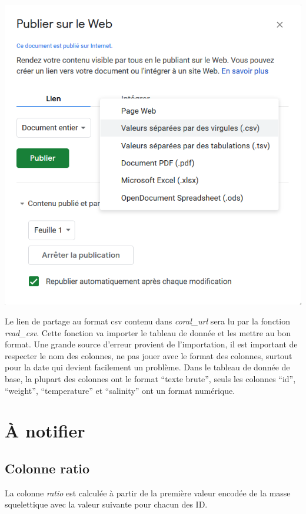\documentclass[]{book}
\begin{document}
\includegraphics{image/notebook-googlesheets2.png}

Le lien de partage au format csv contenu dans \emph{coral\_url} sera lu
par la fonction \emph{read\_csv}. Cette fonction va importer le tableau
de donnée et les mettre au bon format. Une grande source d'erreur
provient de l'importation, il est important de respecter le nom des
colonnes, ne pas jouer avec le format des colonnes, surtout pour la date
qui devient facilement un problème. Dans le tableau de donnée de base,
la plupart des colonnes ont le format ``texte brute'', seuls les
colonnes ``id'', ``weight'', ``temperature'' et ``salinity'' ont un
format numérique.

\section{À notifier}\label{a-notifier}

\subsection{Colonne ratio}\label{colonne-ratio}

La colonne \emph{ratio} est calculée à partir de la première valeur
encodée de la masse squelettique avec la valeur suivante pour chacun des
ID.
\end{document}

